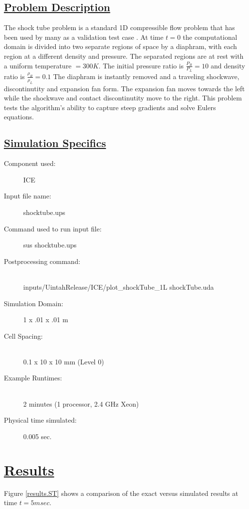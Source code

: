 \subsection*{\underline{Problem Description}}
The shock tube problem is a standard 1D compressible flow problem that
has been used by many as a validation test case \cite{laney, sod, toro}.
At time $t=0$ the computational domain is divided into two separate regions of
space by a diaphram, with each region at a different density and pressure.
The separated regions are at rest with a uniform temperature $=300K$.
The initial pressure ratio is $\frac{P_R}{P_L}  = 10$ and density ratio
is $\frac{\rho_R}{\rho_L} = 0.1$  The diaphram is instantly removed and a
traveling shockwave, discontinutity and expansion fan form.  The expansion
fan moves towards the left while the shockwave and contact discontinutity
move to the right.  This problem tests the algorithm's ability to capture
steep gradients and solve Eulers equations.

 
\subsection*{\underline{Simulation Specifics}}
\begin{description} 
\item [Component used:] \hfill ICE
\item [Input file name:] \hfill shocktube.ups
\item [Command used to run input file:]\hfill sus shocktube.ups
\item [Postprocessing command:]\hfill \\
inputs/UintahRelease/ICE/plot\_shockTube\_1L shockTube.uda

\item [Simulation Domain:]\hfill    1 x .01 x .01 m
\item [Cell Spacing:]\hfill \\ 
0.1 x 10 x 10 mm (Level 0)

\item [Example Runtimes:] \hfill \\
 2 minutes   (1 processor, 2.4 GHz Xeon)

\item [Physical time simulated:] \hfill 0.005 sec.

\end{description}

\section*{\underline{Results}}
Figure \ref{results.ST} shows a comparison of the exact versus simulated
results at time $t = 5msec$.

